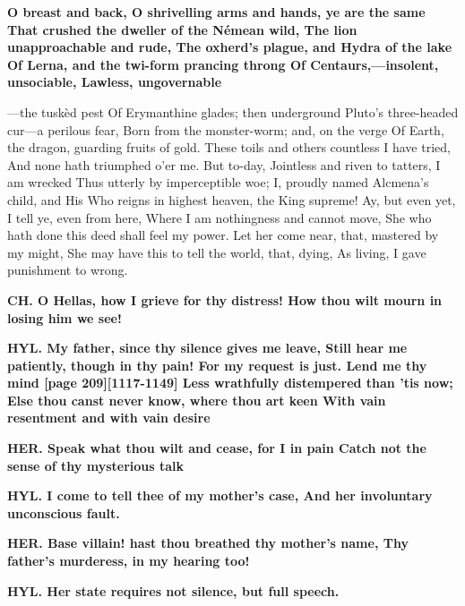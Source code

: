 \documentclass[11pt,letter]{book}
\begin{document}
\par \textbf{O breast and back, O shrivelling arms and hands, ye are the same That crushed the dweller of the Némean wild, The lion unapproachable and rude, The oxherd’s plague, and Hydra of the lake Of Lerna, and the twi-form prancing throng Of Centaurs,—insolent, unsociable, Lawless, ungovernable}
\par  —the tuskèd pest Of Erymanthine glades; then underground Pluto’s three-headed cur—a perilous fear, Born from the monster-worm; and, on the verge Of Earth, the dragon, guarding fruits of gold. These toils and others countless I have tried, And none hath triumphed o’er me. But to-day, Jointless and riven to tatters, I am wrecked Thus utterly by imperceptible woe; I, proudly named Alcmena’s child, and His Who reigns in highest heaven, the King supreme! Ay, but even yet, I tell ye, even from here, Where I am nothingness and cannot move, She who hath done this deed shall feel my power. Let her come near, that, mastered by my might, She may have this to tell the world, that, dying, As living, I gave punishment to wrong.

\par \textbf{CH. O Hellas, how I grieve for thy distress! How thou wilt mourn in losing him we see!}
\par 

\par \textbf{HYL. My father, since thy silence gives me leave, Still hear me patiently, though in thy pain! For my request is just. Lend me thy mind [page 209][1117-1149] Less wrathfully distempered than ’tis now; Else thou canst never know, where thou art keen With vain resentment and with vain desire}
\par 

\par \textbf{HER. Speak what thou wilt and cease, for I in pain Catch not the sense of thy mysterious talk}
\par 

\par \textbf{HYL. I come to tell thee of my mother’s case, And her involuntary unconscious fault.}
\par 

\par \textbf{HER. Base villain! hast thou breathed thy mother’s name, Thy father’s murderess, in my hearing too!}
\par 

\par \textbf{HYL. Her state requires not silence, but full speech.}
\par 
\end{document}
